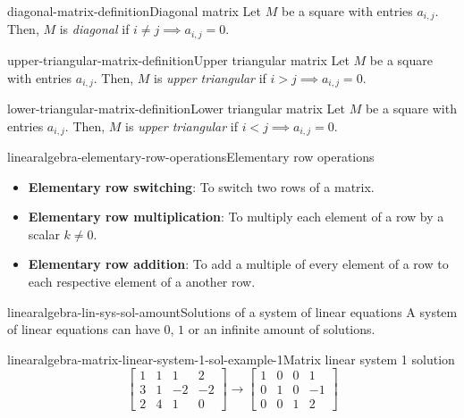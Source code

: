 \documentclass[preview]{standalone}
\begin{document}
\begin{snippetdefinition}{diagonal-matrix-definition}{Diagonal matrix}
    Let \(M\) be a square \matrix with entries \(a_{i,j}\).
    Then, \(M\) is \textit{diagonal} if \(i \neq j \implies a_{i,j} = 0\). 
\end{snippetdefinition}

\begin{snippetdefinition}{upper-triangular-matrix-definition}{Upper triangular matrix}
    Let \(M\) be a square \matrix with entries \(a_{i,j}\).
    Then, \(M\) is \textit{upper triangular} if \(i > j \implies a_{i,j} = 0\). 
\end{snippetdefinition}

\begin{snippetdefinition}{lower-triangular-matrix-definition}{Lower triangular matrix}
    Let \(M\) be a square \matrix with entries \(a_{i,j}\).
    Then, \(M\) is \textit{upper triangular} if \(i < j \implies a_{i,j} = 0\). 
\end{snippetdefinition}

\begin{snippetdefinition}{linearalgebra-elementary-row-operations}{Elementary row operations}
    \begin{itemize}
        \item \textbf{Elementary row switching}:
        To switch two rows of a matrix.
        \item \textbf{Elementary row multiplication}:
        To multiply each element of a row by
        a scalar \(k \neq 0\).
        \item \textbf{Elementary row addition}:
        To add a multiple of every element of a row
        to each respective element of a another row.
    \end{itemize}

\end{snippetdefinition}

\begin{snippetproposition}{linearalgebra-lin-sys-sol-amount}{Solutions of a system of linear equations}
    A system of linear equations can have \(0\), \(1\)
    or an infinite amount of solutions.
\end{snippetproposition}

\begin{snippetexample}{linearalgebra-matrix-linear-system-1-sol-example-1}{Matrix linear system 1 solution}
    \[
        \begin{bmatrix}
            1 & 1 & 1 & 2 \\
            3 & 1 & -2 & -2 \\
            2 & 4 & 1 & 0
        \end{bmatrix}
        \rightarrow
        \begin{bmatrix}
            1 & 0 & 0 & 1 \\
            0 & 1 & 0 & -1 \\
            0 & 0 & 1 & 2
        \end{bmatrix}
    \]
\end{snippetexample}
\end{document}
